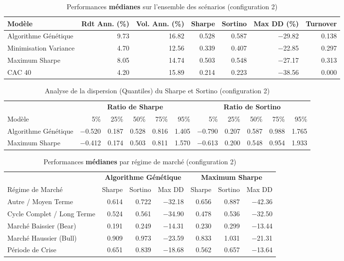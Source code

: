 \begin{table}[H]
\centering
\caption{Performances \textbf{médianes} sur l'ensemble des scénarios (configuration 2)\label{tab:overall_conf2}}
\footnotesize
\begin{tabular}{lrrrrrr}
\toprule
Modèle & \small Rdt Ann. (\%) & \small Vol. Ann. (\%) & \small Sharpe & \small Sortino & \small Max DD (\%) & \small Turnover \\
\midrule
Algorithme Génétique & 9.73 & 16.82 & 0.528 & 0.587 & $-$29.82 & 0.138 \\
Minimisation Variance & 4.70 & 12.56 & 0.339 & 0.407 & $-$22.85 & 0.297 \\
Maximum Sharpe & 8.05 & 14.74 & 0.503 & 0.548 & $-$27.17 & 0.313 \\
CAC 40 & 4.20 & 15.89 & 0.214 & 0.223 & $-$38.56 & 0.000 \\
\bottomrule
\end{tabular}
\end{table}

\begin{table}[H]
\centering
\caption{Analyse de la dispersion (Quantiles) du Sharpe et Sortino (configuration 2)\label{tab:quantiles_conf2}}
\footnotesize
\begin{tabular}{l|rrrrr|rrrrr}
\toprule
& \multicolumn{5}{c|}{\textbf{Ratio de Sharpe}} & \multicolumn{5}{c}{\textbf{Ratio de Sortino}} \\
Modèle & 5\% & 25\% & 50\% & 75\% & 95\% & 5\% & 25\% & 50\% & 75\% & 95\% \\
\midrule
Algorithme Génétique & $-$0.520 & 0.187 & 0.528 & 0.816 & 1.405 & $-$0.790 & 0.207 & 0.587 & 0.988 & 1.765 \\
Maximum Sharpe & $-$0.412 & 0.174 & 0.503 & 0.811 & 1.570 & $-$0.613 & 0.200 & 0.548 & 0.954 & 1.933 \\
\bottomrule
\end{tabular}
\end{table}

\begin{table}[H]
\centering
\caption{Performances \textbf{médianes} par régime de marché (configuration 2)\label{tab:regime_conf2}}
\footnotesize
\begin{tabular}{l|rrr|rrr}
\toprule
& \multicolumn{3}{c|}{\textbf{Algorithme Génétique}} & \multicolumn{3}{c}{\textbf{Maximum Sharpe}} \\
Régime de Marché & Sharpe & Sortino & Max DD & Sharpe & Sortino & Max DD \\
\midrule
Autre / Moyen Terme & 0.614 & 0.722 & $-$32.18 & 0.656 & 0.887 & $-$42.36 \\
Cycle Complet / Long Terme & 0.524 & 0.561 & $-$34.90 & 0.478 & 0.536 & $-$32.50 \\
Marché Baissier (Bear) & 0.191 & 0.249 & $-$14.31 & 0.230 & 0.299 & $-$13.44 \\
Marché Haussier (Bull) & 0.909 & 0.973 & $-$23.59 & 0.833 & 1.031 & $-$21.31 \\
Période de Crise & 0.651 & 0.839 & $-$18.68 & 0.562 & 0.657 & $-$13.64 \\
\bottomrule
\end{tabular}
\end{table}

